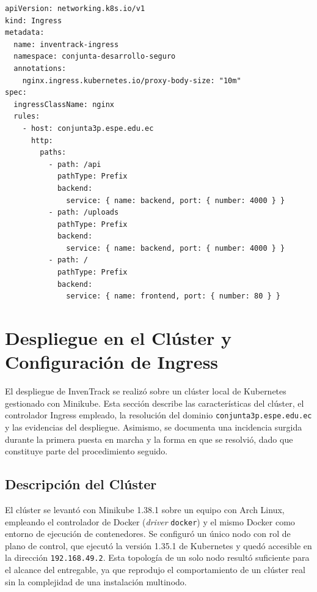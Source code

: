 \documentclass[stu,11pt,spanish,floatsintext]{apa7}
\begin{document}
\begin{lstlisting}[caption={Definición del Ingress (06-ingress.yaml)},label=lst:ingress]
apiVersion: networking.k8s.io/v1
kind: Ingress
metadata:
  name: inventrack-ingress
  namespace: conjunta-desarrollo-seguro
  annotations:
    nginx.ingress.kubernetes.io/proxy-body-size: "10m"
spec:
  ingressClassName: nginx
  rules:
    - host: conjunta3p.espe.edu.ec
      http:
        paths:
          - path: /api
            pathType: Prefix
            backend:
              service: { name: backend, port: { number: 4000 } }
          - path: /uploads
            pathType: Prefix
            backend:
              service: { name: backend, port: { number: 4000 } }
          - path: /
            pathType: Prefix
            backend:
              service: { name: frontend, port: { number: 80 } }
\end{lstlisting}

\section{Despliegue en el Clúster y Configuración de Ingress}

El despliegue de InvenTrack se realizó sobre un clúster local de Kubernetes gestionado con Minikube. Esta sección describe las características del clúster, el controlador Ingress empleado, la resolución del dominio \texttt{conjunta3p.espe.edu.ec} y las evidencias del despliegue. Asimismo, se documenta una incidencia surgida durante la primera puesta en marcha y la forma en que se resolvió, dado que constituye parte del procedimiento seguido.

\subsection{Descripción del Clúster}

El clúster se levantó con Minikube 1.38.1 sobre un equipo con Arch Linux, empleando el controlador de Docker (\textit{driver} \texttt{docker}) y el mismo Docker como entorno de ejecución de contenedores. Se configuró un único nodo con rol de plano de control, que ejecutó la versión 1.35.1 de Kubernetes y quedó accesible en la dirección \texttt{192.168.49.2}. Esta topología de un solo nodo resultó suficiente para el alcance del entregable, ya que reprodujo el comportamiento de un clúster real sin la complejidad de una instalación multinodo.
\end{document}

